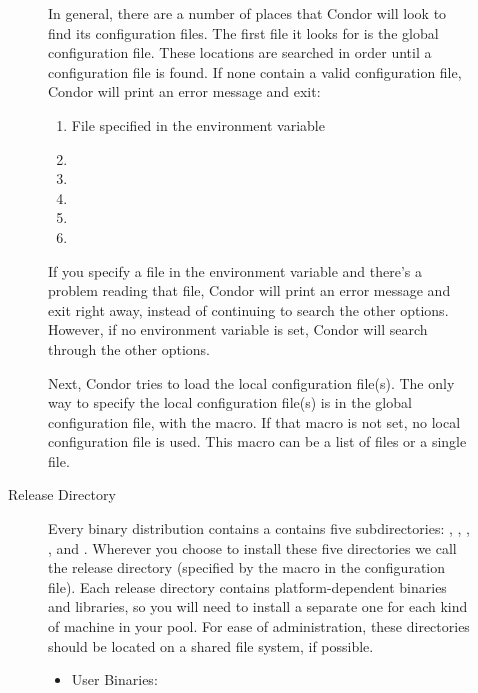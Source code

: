\begin{description}
\begin{description}
In general, there are a number of places that Condor will look to find
its configuration files.  The first file it looks for is the global configuration
file.  These locations are searched in order until a configuration file is
found.  If none contain a valid configuration file, Condor will print an
error message and exit:
\begin{enumerate}
   \item File specified in the  environment variable
   \item {}
   \item {}
   \item {}
   \item {}
   \item {}
\end{enumerate}

If you specify a file in the  environment variable
and there's a problem reading that file, Condor will print an error
message and exit right away, instead of continuing to search the other
options.
However, if no  environment variable is set,
Condor will search through the other options.

Next, Condor tries to load the local configuration file(s).
The only way to specify the local configuration file(s) is in the global configuration
file, with the  macro.  If that macro is not
set, no local configuration file is used.  This macro can be a list of files
or a single file.

\item[Release Directory]

Every binary distribution contains a contains
five subdirectories: , , , ,
and . Wherever you
choose to install these five directories we call the release directory
(specified by the  macro in the configuration file).
Each
release directory contains platform-dependent binaries and libraries,
so you will need to install a separate one for each kind of machine in
your pool.  For ease of administration, these directories should be
located on a shared file system, if possible.

\begin{itemize}
     \item User Binaries:


\end{itemize}
\end{description}
\end{description}
